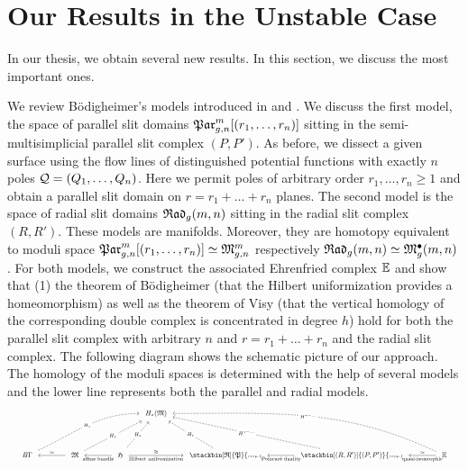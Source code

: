 \section{Our Results in the Unstable Case}
In our thesis, we obtain several new results.
In this section, we discuss the most important ones.

We review Bödigheimer's models introduced in \cite{Boedigheimer19901} and \cite{Boedigheimer2006}.
We discuss the first model, the space of parallel slit domains $\Parr$ sitting in the semi-multisimplicial parallel slit complex $(P,P')$.
As before, we dissect a given surface using the flow lines of distinguished potential functions with exactly $n$ poles $\mc Q = (Q_1, \ldots, Q_n)$.
Here we permit poles of arbitrary order $r_1, \ldots, r_n \ge 1$ and obtain a parallel slit domain on $r = r_1 + \ldots + r_n$ planes.
The second model is the space of radial slit domains ${\mathfrak{Rad}_g(m,n)}$ sitting in the radial slit complex $(R,R')$.
These models are manifolds.
Moreover, they are homotopy equivalent to moduli space $\Parr \simeq \Modspc$ respectively ${\mathfrak{Rad}_g(m,n)} \simeq \mathfrak{M}^\bullet_g(m, n)$.
For both models, we construct the associated Ehrenfried complex $\mathbb E$ and show that 
(1) the theorem of Bödigheimer (that the Hilbert uniformization provides a homeomorphism)
as well as the theorem of Visy (that the vertical homology of the corresponding double complex is concentrated in degree $h$) hold for both
the parallel slit complex with arbitrary $n$ and $r = r_1 + \ldots + r_n$ and the radial slit complex.
The following diagram shows the schematic picture of our approach.
The homology of the moduli spaces is determined with the help of several models and the lower line represents both the parallel and radial models.
\[
    \resizebox{\linewidth}{!}{
        \begin{tikzcd}[row sep=10ex, scale=1.3, ampersand replacement=\&]
            \&\&\&\&\&H_\ast(\mathfrak M) \\
            B\Gamma \arrow[<-, shorten <=1ex, shorten >=1ex]{rr}{\simeq} \arrow[dashed, out=25, in=180, shorten <=1ex, shorten >=1ex]{rrrrru}[description]{H_\ast} \&\&
            \mathfrak M \arrow[<-, shorten <=1ex, shorten >=1ex]{rr}[swap]{\text{affine bundle}} \arrow[dashed, shorten <=1ex, shorten >=1ex]{rrru}[description]{H_\ast} \&\&
            \mathfrak H \arrow[shorten <=1ex, shorten >=1ex]{rr}{\cong}[swap]{\text{Hilbert uniformization}} \arrow[dashed, shorten <=1ex, shorten >=1ex]{ru}[description]{H_\ast} \&\&
            \stackbin[\mathfrak R]{\mathfrak P}{\scriptscriptstyle{resp.}} \arrow[<-, shorten <=1ex, shorten >=1ex]{rr}[swap]{\text{Poincaré duality}} \arrow[dashed, shorten <=1ex, shorten >=1ex]{lu}[description]{H_\ast} \&\&
            \stackbin[(R,R')]{(P,P')}{\scriptscriptstyle{resp.}} \arrow[<-, shorten <=1ex, shorten >=1ex]{rr}{\simeq}[swap]{\text{quasi-isomorphic}} \arrow[dashed, shorten <=1ex, shorten >=1ex]{lllu}[description]{H^{\ast-\ldots}} \&\&
            \E \arrow[dashed, out=155, in=0, shorten <=1ex, shorten >=1ex]{lllllu}[description]{H^{\ast-\ldots}}
        \end{tikzcd}
    }
\]

